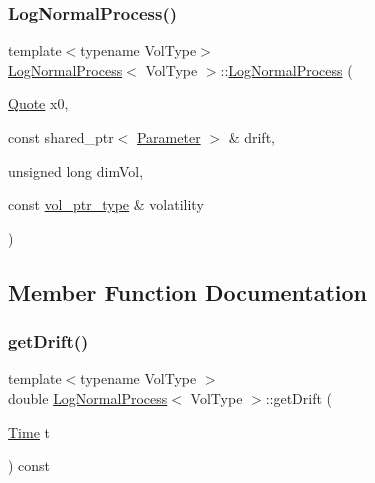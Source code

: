 \subsubsection{\texorpdfstring{Log\+Normal\+Process()}{LogNormalProcess()}\hspace{0.1cm}{\footnotesize\ttfamily [2/2]}}
{\footnotesize\ttfamily template$<$typename Vol\+Type$>$ \\
\hyperlink{class_log_normal_process}{Log\+Normal\+Process}$<$ Vol\+Type $>$\+::\hyperlink{class_log_normal_process}{Log\+Normal\+Process} (\begin{DoxyParamCaption}\item[{\hyperlink{_name_def_8h_a642a6c5fd87319d922637de0e0bb0305}{Quote}}]{x0,  }\item[{const shared\+\_\+ptr$<$ \hyperlink{class_parameter}{Parameter} $>$ \&}]{drift,  }\item[{unsigned long}]{dim\+Vol,  }\item[{const \hyperlink{class_log_normal_process_a904926553c5e4d60e52caf87e1745651}{vol\+\_\+ptr\+\_\+type} \&}]{volatility }\end{DoxyParamCaption})}



\subsection{Member Function Documentation}
\hypertarget{class_log_normal_process_a629e2612ff67a957accb04e5fe0ad2a9}{}\label{class_log_normal_process_a629e2612ff67a957accb04e5fe0ad2a9} 
\subsubsection{\texorpdfstring{get\+Drift()}{getDrift()}\hspace{0.1cm}{\footnotesize\ttfamily [1/2]}}
{\footnotesize\ttfamily template$<$typename Vol\+Type $>$ \\
double \hyperlink{class_log_normal_process}{Log\+Normal\+Process}$<$ Vol\+Type $>$\+::get\+Drift (\begin{DoxyParamCaption}\item[{\hyperlink{_name_def_8h_ac2d3e0ba793497bcca555c7c2cf64ff3}{Time}}]{t }\end{DoxyParamCaption}) const}

\hypertarget{class_log_normal_process_a474db0a26169f742a61cb187347151ec}{}\label{class_log_normal_process_a474db0a26169f742a61cb187347151ec} 
